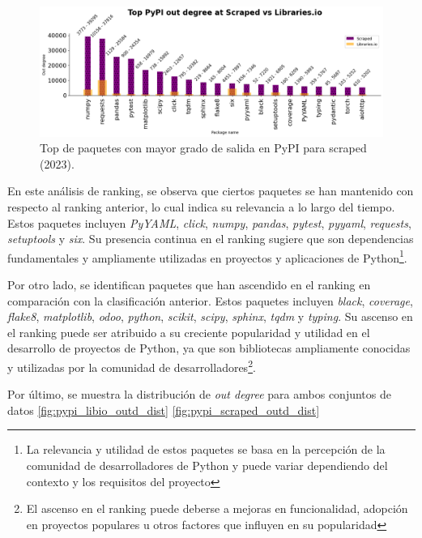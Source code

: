 \begin{figure}[h!]
    \begin{center}
        \includegraphics[width=1\textwidth]{img/pypi/libio_scraped_t20_comparation.png}
        \caption{Top de paquetes con mayor grado de salida en PyPI para scraped (2023).}
        \label{fig:pypi_scraped_outd_comparison}
    \end{center}
\end{figure}

En este análisis de ranking, se observa que ciertos paquetes se han mantenido con respecto al ranking
anterior, lo cual indica su relevancia a lo largo del tiempo. Estos
paquetes incluyen \textit{PyYAML}, \textit{click}, \textit{numpy}, \textit{pandas}, \textit{pytest},
\textit{pyyaml}, \textit{requests}, \textit{setuptools} y \textit{six}. Su presencia continua en el
ranking sugiere que son dependencias fundamentales y ampliamente utilizadas en proyectos y aplicaciones
de Python\footnote{La relevancia y utilidad de estos paquetes se basa en la percepción de la comunidad
    de desarrolladores de Python y puede variar dependiendo del contexto y los requisitos del proyecto}.

Por otro lado, se identifican paquetes que han ascendido en el ranking en comparación con la clasificación
anterior. Estos paquetes incluyen \textit{black}, \textit{coverage}, \textit{flake8}, \textit{matplotlib},
\textit{odoo}, \textit{python}, \textit{scikit}, \textit{scipy}, \textit{sphinx}, \textit{tqdm} y
\textit{typing}. Su ascenso en el ranking puede ser atribuido a su creciente popularidad y utilidad en el
desarrollo de proyectos de Python, ya que son bibliotecas ampliamente conocidas y utilizadas por la
comunidad de desarrolladores\footnote{El ascenso en el ranking puede deberse a mejoras en funcionalidad,
    adopción en proyectos populares u otros factores que influyen en su popularidad}.

Por último, se muestra la distribución de \textit{out degree} para ambos conjuntos de datos \ref{fig:pypi_libio_outd_dist} \ref{fig:pypi_scraped_outd_dist}

